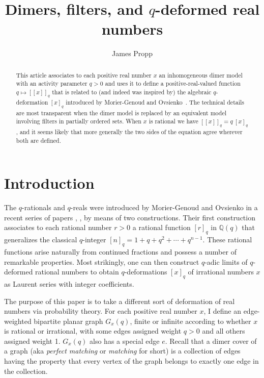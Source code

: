 \documentclass[12pt]{article}
\title{\textbf{
Dimers, filters, and $q$-deformed real numbers}}
\author{James Propp}
\date{}
\theoremstyle{plain}
\theoremstyle{definition}
\theoremstyle{remark}
\newcommand{\QQ}{{\mathds Q}}
\newcommand{\llb}{[\![}
\newcommand{\rrb}{]\!]}
\begin{document}
\maketitle

\begin{abstract}
\noindent
This article associates to each positive real number $x$
an inhomogeneous dimer model with an activity parameter $q>0$
and uses it to define a positive-real-valued function $q \mapsto \llb x \rrb_q$
that is related to (and indeed was inspired by) 
the algebraic $q$-deformation $[x]_q$
introduced by Morier-Genoud and Ovsienko~\cite{MO22}.
The technical details are most transparent
when the dimer model is replaced by an equivalent model 
involving filters in partially ordered sets.
When $x$ is rational we have $\llb x \rrb_q = q \: [x]_q$,
and it seems likely that more generally
the two sides of the equation agree wherever both are defined. 

\end{abstract}

\section{Introduction}
\label{sec:intro}

The $q$-rationals and $q$-reals were introduced by Morier-Genoud and Ovsienko
in a recent series of papers \cite{MO20}, \cite{MO22}, \cite{MO25} by means
of two constructions.  Their first construction associates to each rational 
number $r>0$ a rational function $[r]_q$ in $\QQ(q)$ that generalizes the 
classical $q$-integer $[n]_q = 1+q+q^2+\cdots+q^{n-1}$. These rational 
functions arise naturally from continued fractions and possess a number of 
remarkable properties.  Most strikingly, one can then construct $q$-adic 
limits of $q$-deformed rational numbers to obtain $q$-deformations $[x]_q$ 
of irrational numbers $x$ as Laurent series with integer coefficients. 

The purpose of this paper is to take a different sort of deformation of 
real numbers via probability theory.
For each positive real number $x$, I define 
an edge-weighted bipartite planar graph $G_x(q)$, 
finite or infinite according to whether $x$ is rational or irrational,
with some edges assigned weight $q>0$ and all others assigned weight 1.
$G_x(q)$ also has a special edge $e$.  
Recall that a dimer cover of a graph 
(aka {\em perfect matching} or {\em matching} for short) 
is a collection of edges having the property that 
every vertex of the graph belongs to exactly one edge in the collection.
\end{document}
